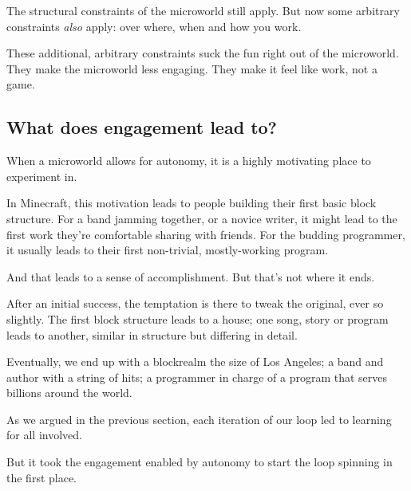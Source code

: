 The structural constraints of the microworld still apply. But now some
arbitrary constraints \emph{also} apply: over where, when and how you
work.

These additional, arbitrary constraints suck the fun right out of the
microworld. They make the microworld less engaging. They make it feel
like work, not a game.

\subsection{What does engagement lead to?}

When a microworld allows for autonomy, it is a highly motivating place
to experiment in.

In Minecraft, this motivation leads to people building their first basic
block structure. For a band jamming together, or a novice writer, it
might lead to the first work they're comfortable sharing with friends.
For the budding programmer, it usually leads to their first non-trivial,
mostly-working program.

And that leads to a sense of accomplishment. But that's not where it
ends.

After an initial success, the temptation is there to tweak the original,
ever so slightly. The first block structure leads to a house; one song,
story or program leads to another, similar in structure but differing in
detail.

Eventually, we end up with a blockrealm the size of Los Angeles; a band
and author with a string of hits; a programmer in charge of a program
that serves billions around the world.

As we argued in the previous section, each iteration of our loop led to
learning for all involved.

But it took the engagement enabled by autonomy to start the loop
spinning in the first place.
